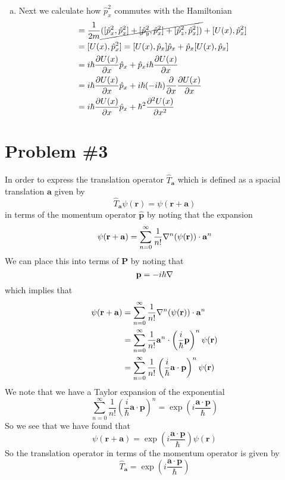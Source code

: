 \documentclass[11pt]{article}
\numberwithin{equation}{section}
\begin{document}
\begin{enumerate}[(a)]
\item Next we calculate how $\hat{p}_x^2$ commutes with the Hamiltonian
\begin{align*}
[\hat{H},\hat{p}_x^2] &= \frac{1}{2m}\cancel{([\hat{p}^2_x,\hat{p}_x^2] + [\hat{p}^2_y,\hat{p}_x^2] + [\hat{p}^2_z,\hat{p}_x^2])}+[U(x),\hat{p}_x^2]\\
&= [U(x),\hat{p}_x^2] = [U(x),\hat{p}_x]\hat{p}_x + \hat{p}_x[U(x),\hat{p}_x]\\
&= i\hbar\partiald{U(x)}{x}\hat{p}_x + \hat{p}_xi\hbar\partiald{U(x)}{x}\\
&= i\hbar\partiald{U(x)}{x}\hat{p}_x + i\hbar(-i\hbar)\partiald{}{x}\partiald{U(x)}{x}\\
&= i\hbar\partiald{U(x)}{x}\hat{p}_x + \hbar^2\partiald{^2U(x)}{x^2}
\end{align*}



\end{enumerate}

\pagebreak

\section{Problem \#3}
In order to express the translation operator $\hat{T}_{\mathbf{a}}$ which is defined as a 
spacial translation $\mathbf{a}$ given by
$$\hat{T}_{\mathbf{a}}\psi(\mathbf{r}) = \psi(\mathbf{r}+\mathbf{a})$$
in terms of the momentum operator $\mathbf{\hat{p}}$ by noting that the expansion
$$\psi(\mathbf{r}+\mathbf{a}) = \sum_{n=0}^{\infty}\frac{1}{n!}\bold\nabla^n(\psi(\mathbf{r}))\cdot\mathbf{a}^n$$
We can place this into terms of $\mathbf{P}$ by noting that
$$\mathbf{p} = -i\hbar\bold\nabla$$
which implies that
\begin{align*}
\psi(\mathbf{r}+\mathbf{a}) &= \sum_{n=0}^{\infty}\frac{1}{n!}\bold\nabla^n(\psi(\mathbf{r}))\cdot\mathbf{a}^n\\
&= \sum_{n=0}^{\infty}\frac{1}{n!}\mathbf{a}^n\cdot\left(\frac{i}{\hbar}\mathbf{p}\right)^n\psi(\mathbf{r})\\
&= \sum_{n=0}^{\infty}\frac{1}{n!}\left(\frac{i}{\hbar}\mathbf{a}\cdot\mathbf{p}\right)^n\psi(\mathbf{r})
\end{align*}
We note that we have a Taylor expansion of the exponential
$$\sum_{n=0}^{\infty}\frac{1}{n!}\left(\frac{i}{\hbar}\mathbf{a}\cdot\mathbf{p}\right)^n = \exp\left(i\frac{\mathbf{a}\cdot\mathbf{p}}{\hbar}\right)$$
So we see that we have found that
$$\psi(\mathbf{r}+\mathbf{a}) = \exp\left(i\frac{\mathbf{a}\cdot\mathbf{p}}{\hbar}\right)\psi(\mathbf{r})$$
So the translation operator in terms of the momentum operator is given by
$$\hat{T}_{\mathbf{a}}= \exp\left(i\frac{\mathbf{a}\cdot\mathbf{p}}{\hbar}\right)$$
\end{document}
